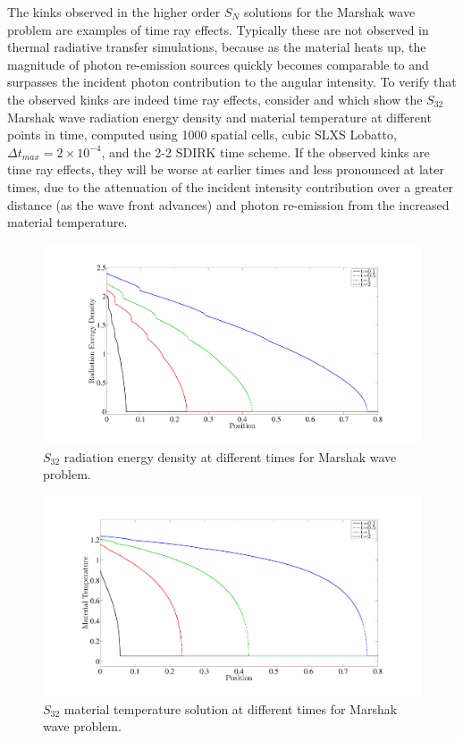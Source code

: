 The kinks observed in the higher order $S_N$ solutions for the Marshak wave problem are examples of time ray effects.
Typically these are not observed in thermal radiative transfer simulations, because as the material heats up, the magnitude of photon re-emission sources quickly becomes comparable to and surpasses the incident photon contribution to the angular intensity.
To verify that the observed kinks are indeed time ray effects, consider  and  which show the $S_{32}$ Marshak wave radiation energy density and material temperature at different points in time, computed using 1000 spatial cells, cubic SLXS Lobatto, $\Delta t_{max} = 2 \times 10^{-4}$, and the 2-2 SDIRK time scheme.
If the observed kinks are time ray effects, they will be worse at earlier times and less pronounced at later times, due to the attenuation of the incident intensity contribution over a greater distance (as the wave front advances) and photon re-emission from the increased material temperature.
\begin{figure}[!htp]
\centering
\includegraphics[width=17cm,trim=2in  0.5in 0.5in 0.75in,clip=true]{chapter6_grey_radtran/Dissertation_Data/S32_Time_Ray_Effects_Radiation_Cv1_SigA1.pdf}
\caption{$S_{32}$ radiation energy density at different times for Marshak wave problem.}
\label{fig:phi_time_slices}
\end{figure}
\begin{figure}[!hbp]
\centering
\includegraphics[width=17cm,trim=2in  0.4in 0.5in 0.75in,clip=true]{chapter6_grey_radtran/Dissertation_Data/S32_Time_Ray_Effects_Temperature_Cv1_SigA1.pdf}
\caption{$S_{32}$ material temperature solution at different times for Marshak wave problem.}
\label{fig:temp_time_slices}
\end{figure}
